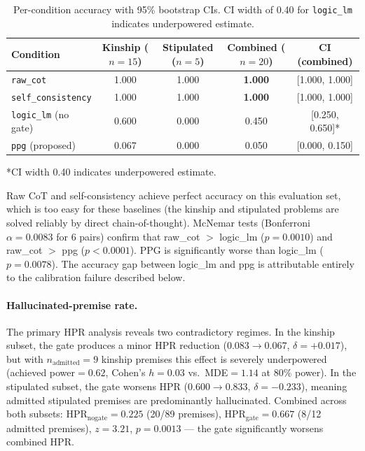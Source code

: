 \documentclass[11pt,letterpaper]{article}
\begin{document}
\begin{table}[!htbp]
  \centering
  \caption{Per-condition accuracy with 95\% bootstrap CIs. CI width of 0.40 for \texttt{logic\_lm} indicates underpowered estimate.}
  \label{tab:accuracy}
  \begin{tabular}{lcccc}
    \toprule
    Condition & Kinship ($n=15$) & Stipulated ($n=5$) & Combined ($n=20$) & CI (combined) \\
    \midrule
    \texttt{raw\_cot}         & 1.000 & 1.000 & \textbf{1.000} & [1.000, 1.000] \\
    \texttt{self\_consistency} & 1.000 & 1.000 & \textbf{1.000} & [1.000, 1.000] \\
    \texttt{logic\_lm} (no gate) & 0.600 & 0.000 & 0.450 & [0.250, 0.650]* \\
    \texttt{ppg} (proposed)   & 0.067 & 0.000 & 0.050 & [0.000, 0.150] \\
    \bottomrule
  \end{tabular}
  \smallskip\par\noindent\footnotesize{*CI width 0.40 indicates underpowered estimate.}
\end{table}

Raw CoT and self-consistency achieve perfect accuracy on this evaluation set, which is too easy for these baselines (the kinship and stipulated problems are solved reliably by direct chain-of-thought). McNemar tests (Bonferroni $\alpha=0.0083$ for 6 pairs) confirm that raw\_cot $>$ logic\_lm ($p=0.0010$) and raw\_cot $>$ ppg ($p<0.0001$). PPG is significantly worse than logic\_lm ($p=0.0078$). The accuracy gap between logic\_lm and ppg is attributable entirely to the calibration failure described below.

\paragraph{Hallucinated-premise rate.}
The primary HPR analysis reveals two contradictory regimes. In the kinship subset, the gate produces a minor HPR reduction ($0.083 \to 0.067$, $\delta=+0.017$), but with $n_{\mathrm{admitted}}=9$ kinship premises this effect is severely underpowered (achieved power$=0.62$, Cohen's $h=0.03$ vs.\ MDE$=1.14$ at 80\% power). In the stipulated subset, the gate worsens HPR ($0.600 \to 0.833$, $\delta=-0.233$), meaning admitted stipulated premises are predominantly hallucinated. Combined across both subsets: HPR$_{\mathrm{nogate}}=0.225$ (20/89 premises), HPR$_{\mathrm{gate}}=0.667$ (8/12 admitted premises), $z=3.21$, $p=0.0013$ --- the gate significantly worsens combined HPR.
\end{document}
